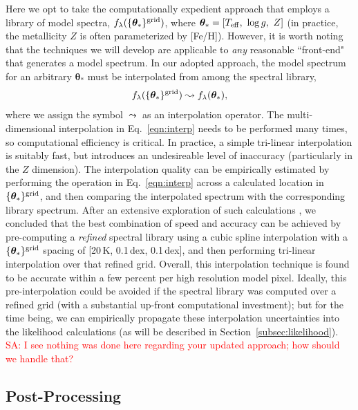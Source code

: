 \documentclass[iop,floatfix]{emulateapj}
\newcommand{\vt}{ {\bm \theta}}
\newcommand{\flam}{f_\lambda}
\newcommand{\vt}{ {\bm \theta}}
\newcommand{\fundamentalParameters}{\vt_{\ast}}
\newcommand{\gridParameters}{\{\fundamentalParameters\}^{\rm 
grid}}
\newcommand{\comm}[1]{ \textcolor{red}{SA: #1}}
\begin{document}
Here we opt to take the computationally expedient approach that employs a library of model spectra, 
$\flam(\gridParameters)$, where $\vt_{\ast} = [T_{\rm eff}, \,\, \log{g}, \,\, Z]$ 
(in practice, the metallicity $Z$ is often parameterized by [Fe/H]).  However, it is worth noting 
that the techniques we will develop are applicable to {\it any} reasonable ``front-end" that 
generates a model spectrum.  In our adopted approach, the model spectrum for an arbitrary 
$\vt_{\ast}$ must be interpolated from among the spectral library, 
\begin{equation}
\flam(\gridParameters) \leadsto \flam(\fundamentalParameters),
\label{eqn:interp}
\end{equation}
where we assign the symbol $\leadsto$ as an interpolation operator.  The multi-dimensional 
interpolation in Eq.~\ref{eqn:interp} needs to be performed many times, so computational efficiency 
is critical.  In practice, a simple tri-linear interpolation is suitably fast, but introduces an 
undesireable level of inaccuracy (particularly in the $Z$ dimension).  The interpolation quality 
can be empirically estimated by performing the operation in Eq.~\ref{eqn:interp} across a 
calculated location in $\{\vt_{\ast}\}^{\rm grid}$, and then comparing the interpolated spectrum 
with the corresponding library spectrum.  After an extensive exploration of such calculations 
\citep[see also][]{husser12}, we concluded that the best combination of speed and accuracy can be 
achieved by pre-computing a {\it refined} spectral library using a cubic spline interpolation with 
a $\{\vt_{\ast}\}^{\rm grid}$ spacing of [20\,K, 0.1\,dex, 0.1\,dex], and then performing 
tri-linear interpolation over that refined grid.  Overall, this interpolation technique is found to 
be accurate within a few percent per high resolution model pixel.  Ideally, this pre-interpolation 
could be avoided if the spectral library was computed over a refined grid (with a substantial 
up-front computational investment); but for the time being, we can empirically propagate these 
interpolation uncertainties into the likelihood calculations (as will be described in 
Section~\ref{subsec:likelihood}).  
\comm{I see nothing was done here regarding your updated approach; how should we handle that?}


\subsection{Post-Processing} \label{subsec:postprocess}
\end{document}
